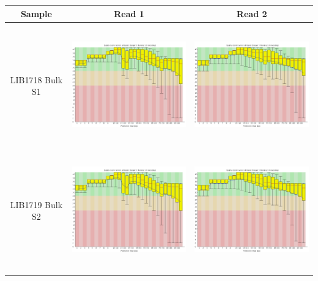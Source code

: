 \begin{center}
\begin{tabular}{ccc}
\toprule
Sample  & Read 1 & Read 2 \\ \midrule 
\\
\begin{sideways}LIB1718 Bulk S1\end{sideways} & \includegraphics[height=5cm]{Appendices/images/Sample_LIB1718_base_quality_R1.png} & \includegraphics[height=5cm]{Appendices/images/Sample_LIB1718_base_quality_R2.png} \\ \midrule  \\
\begin{sideways}LIB1719 Bulk S2\end{sideways} & \includegraphics[height=5cm]{Appendices/images/Sample_LIB1719_base_quality_R1.png} & \includegraphics[height=5cm]{Appendices/images/Sample_LIB1719_base_quality_R2.png} \\ \midrule  \\

\end{tabular}
\end{center}

